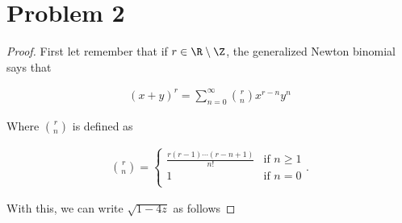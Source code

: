 ﻿\chapter{Problem 2}
\setcounter{theorem}{1}

\begin{proof}
    First let remember that if $r \in \R \setminus \Z$, the generalized Newton binomial says that
    
    \begin{align}
            (x + y)^r = \sum_{n = 0}^{\infty} \binom{r}{n} x^{r-n} y^{n}
    \end{align}\pn
    
    Where $\binom{r}{n}$ is defined as
    
    \begin{align}
            \binom{r}{n} = \begin{cases}
                                \frac{r(r-1)\cdots(r-n+1)}{n!} & \text{if } n \geq 1   \\
                                1                              & \text{if } n = 0   \\
                           \end{cases}.
    \end{align}\pn
    
    
    
    With this, we can write $\sqrt{1 - 4z}$ as follows
    

\end{proof}
